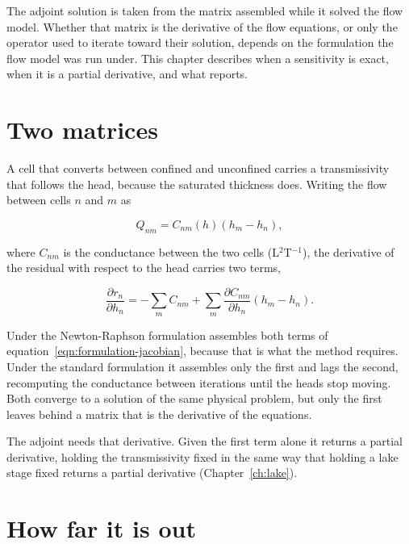 The adjoint solution is taken from the matrix \mf{} assembled while it solved the flow model. Whether that matrix is the derivative of the flow equations, or only the operator used to iterate toward their solution, depends on the formulation the flow model was run under. This chapter describes when a sensitivity is exact, when it is a partial derivative, and what \adj{} reports.

\section*{Two matrices}

A cell that converts between confined and unconfined carries a transmissivity that follows the head, because the saturated thickness does. Writing the flow between cells $n$ and $m$ as

\begin{equation}
	\label{eqn:formulation-flow}
	Q_{nm} = C_{nm}(h)\left( h_{m} - h_{n} \right),
\end{equation}

\noindent where $C_{nm}$ is the conductance between the two cells (L$^{2}$T$^{-1}$), the derivative of the residual with respect to the head carries two terms,

\begin{equation}
	\label{eqn:formulation-jacobian}
	\frac{\partial r_{n}}{\partial h_{n}} = -\sum_{m} C_{nm}
	+ \sum_{m} \frac{\partial C_{nm}}{\partial h_{n}}
	\left( h_{m} - h_{n} \right).
\end{equation}

Under the Newton-Raphson formulation \mf{} assembles both terms of equation~\ref{eqn:formulation-jacobian}, because that is what the method requires. Under the standard formulation it assembles only the first and lags the second, recomputing the conductance between iterations until the heads stop moving. Both converge to a solution of the same physical problem, but only the first leaves behind a matrix that is the derivative of the equations.

The adjoint needs that derivative. Given the first term alone it returns a partial derivative, holding the transmissivity fixed in the same way that holding a lake stage fixed returns a partial derivative (Chapter~\ref{ch:lake}).

\section*{How far it is out}

